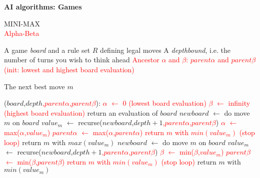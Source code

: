 \documentclass[11pt] {article}
\newcommand{\algorithmicinput}{\textbf{Input:}}
\newcommand{\algorithmicoutput}{\textbf{Output:}}
\newcommand{\INPUT}{\item[\algorithmicinput]}
\newcommand{\OUTPUT}{\item[\algorithmicoutput]}
\newcommand{\algorithmicalgo}{\textbf{Algorithm}}
\newcommand{\ALGO}{\item[\algorithmicalgo]}
\begin{document}
\pagestyle{empty}


\begin{center}
\LARGE
\textbf{AI algorithms: Games}\\
\end{center}
\vspace{1cm}

\noindent \large{MINI-MAX}\\
\textcolor{red}{\large{Alpha-Beta}}\\

\begin{algorithmic}
\INPUT
\STATE A game \emph{board} and a rule set $R$ defining legal moves
\STATE A \emph{depthbound}, i.e. the number of turns you wish to think ahead
\STATE \textcolor{red}{Ancestor $\alpha$ and $\beta$: $parent\alpha$ and $parent\beta$ (init: lowest and highest board evaluation)}\\

\OUTPUT 
\STATE The next best move $m$
\end{algorithmic}
\begin{algorithmic}
\ALGO($board$,$depth$\textcolor{red}{,$parent\alpha$,$parent\beta$}):
\textcolor{red}{
\STATE $\alpha$ $\leftarrow$ 0 (lowest board evaluation)
\STATE $\beta$ $\leftarrow$ infinity (highest board evaluation)
}
\STATE return an evaluation of $board$
\ELSE
{}
\STATE $newboard$ $\leftarrow$ do move $m$ on $board$
\STATE $value_m$ $\leftarrow$ recurse($newboard$,$depth+1$\textcolor{red}{,$parent\alpha$,$parent\beta$})
\STATE \textcolor{red}{$\alpha$ $\leftarrow$ max($\alpha$,$value_m$)}
\STATE \textcolor{red}{$parent\alpha$ $\leftarrow$ max($\alpha$,$parent\alpha$)}
\textcolor{red}{
\STATE return $m$ with $min(value_m)$ (stop loop)
\ENDIF
}
\ENDFOR
\STATE return $m$ with $max(value_m)$
\ENDIF
{}
\STATE $newboard$ $\leftarrow$ do move $m$ on $board$
\STATE $value_m$ $\leftarrow$ recurse($newboard$,$depth+1$\textcolor{red}{,$parent\alpha$,$parent\beta$})
\STATE \textcolor{red}{$\beta$ $\leftarrow$ min($\beta$,$value_m$)}
\STATE \textcolor{red}{$parent\beta$ $\leftarrow$ min($\beta$,$parent\beta$)}
\textcolor{red}{
\STATE return $m$ with $min(value_m)$ (stop loop)
\ENDIF
}
\ENDFOR
\STATE return $m$ with $min(value_m)$
\ENDIF
\ENDIF

\end{algorithmic}
\end{document}

